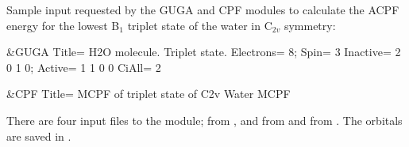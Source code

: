 Sample input requested by the GUGA and CPF modules to calculate the ACPF energy for
the lowest B$_1$ triplet state of the water in C$_{2v}$ symmetry:
\begin{inputlisting}
 &GUGA
Title= H2O molecule. Triplet state.
Electrons= 8; Spin= 3
Inactive= 2 0 1 0; Active= 1 1 0 0
CiAll= 2

 &CPF
Title= MCPF of triplet state of C2v Water
MCPF
\end{inputlisting}

There are four input files to the  module; 
from ,  and  from
 and  from .  The orbitals
are saved in .
